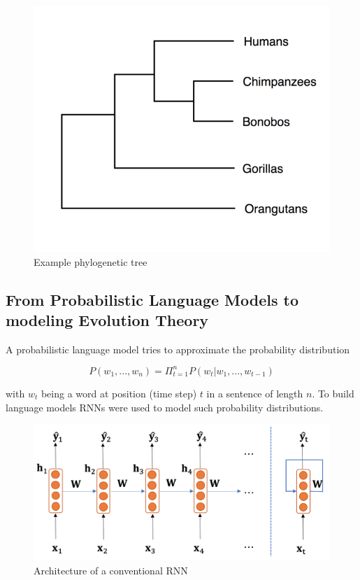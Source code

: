 \begin{figure}[ht]
	\centering
	\includegraphics[width=0.5\linewidth]{figures/examplePhylogeneticTree.png}
	\caption{Example phylogenetic tree \cite{mallawaarachchiMolecularPhylogeneticsUsing2018}}
	\label{examplePhylogeneticTree}
\end{figure}



\subsection{From Probabilistic Language Models to modeling Evolution Theory} \label{fundamentalsA}

A probabilistic language model tries to approximate the probability distribution 

\begin{equation}
	P(w_1, ..., w_n) = \Pi_{t=1}^{n} P(w_t | w_1, ..., w_{t-1})
\end{equation}

with $w_t$ being a word at position (time step) $t$ in a sentence of length $n$. To build language models \acp{RNN} were used to model such probability distributions. 

\begin{figure}[ht]
	\centering
	\includegraphics[width=0.8\linewidth]{figures/rnn_architecture.png}
	\caption{Architecture of a conventional \ac{RNN} \cite{Gertz2020}}
	\label{rnn_architecture}
\end{figure}

